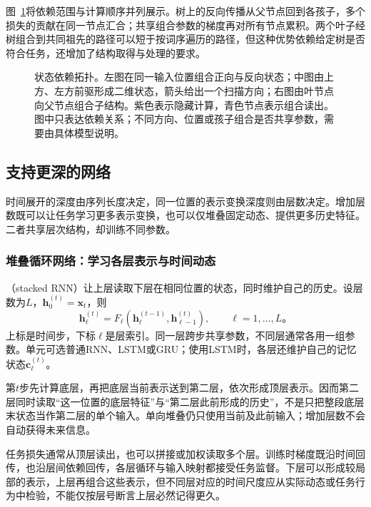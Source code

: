 图~\ref{fig:rnn-topologies}将依赖范围与计算顺序并列展示。树上的反向传播从父节点回到各孩子，多个损失的贡献在同一节点汇合；共享组合参数的梯度再对所有节点累积。两个叶子经树组合到共同祖先的路径可以短于按词序遍历的路径，但这种优势依赖给定树是否符合任务，还增加了结构取得与处理的要求。

\begin{figure}[t]
  \centering
  
  \caption{状态依赖拓扑。左图在同一输入位置组合正向与反向状态；中图由上方、左方前驱形成二维状态，箭头给出一个扫描方向；右图由叶节点向父节点组合子结构。紫色表示隐藏计算，青色节点表示组合读出。图中只表达依赖关系；不同方向、位置或孩子组合是否共享参数，需要由具体模型说明。}
  \label{fig:rnn-topologies}
\end{figure}

\subsection{支持更深的网络}
\label{sec:rnn-depth}

时间展开的深度由序列长度决定，同一位置的表示变换深度则由层数决定。增加层数既可以让任务学习更多表示变换，也可以仅堆叠固定动态、提供更多历史特征。二者共享层次结构，却训练不同参数。

\subsubsection{堆叠循环网络：学习各层表示与时间动态}
\label{sec:rnn-stacked-networks}

（stacked RNN）让上层读取下层在相同位置的状态，同时维护自己的历史。设层数为$L$，$\bm h_0^{(t)}=\bm x_t$，则
\begin{equation}
  \bm h_{\ell}^{(t)}=F_{\ell}\!\left(\bm h_{\ell}^{(t-1)},
       \bm h_{\ell-1}^{(t)}\right),\qquad\ell=1,\ldots,L\text{。}
  \label{eq:rnn-stacked}
\end{equation}
上标是时间步，下标$\ell$是层索引。同一层跨步共享参数，不同层通常各用一组参数。单元可选普通RNN、LSTM或GRU；使用LSTM时，各层还维护自己的记忆状态$\bm c_\ell^{(t)}$。

第$t$步先计算底层，再把底层当前表示送到第二层，依次形成顶层表示。因而第二层同时读取“这一位置的底层特征”与“第二层此前形成的历史”，不是只把整段底层末状态当作第二层的单个输入。单向堆叠仍只使用当前及此前输入；增加层数不会自动获得未来信息。

任务损失通常从顶层读出，也可以拼接或加权读取多个层。训练时梯度既沿时间回传，也沿层间依赖回传，各层循环与输入映射都接受任务监督。下层可以形成较局部的表示，上层再组合这些表示，但不同层对应的时间尺度应从实际动态或任务行为中检验，不能仅按层号断言上层必然记得更久。

